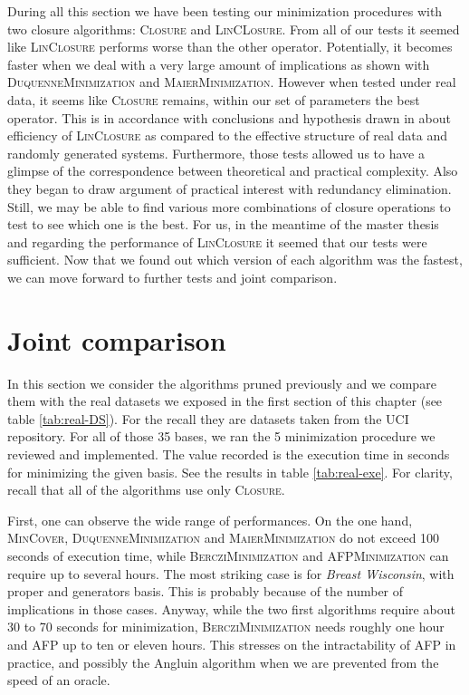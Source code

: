 During all this section we have been testing our minimization procedures with two closure algorithms: \textsc{Closure} and \textsc{LinCLosure}. From all of
our tests it seemed like \textsc{LinClosure} performs worse than the 
other operator. Potentially, it becomes faster when we deal with a very large amount of implications as shown with \textsc{DuquenneMinimization} and \textsc{MaierMinimization}. However when tested under real data, it seems like \textsc{Closure} remains, within our set of parameters the best operator. This is in accordance with conclusions and hypothesis drawn in
\cite{bazhanov_optimizations_2014} about efficiency of \textsc{LinClosure} as compared to the effective structure of real data and randomly generated systems. Furthermore, those tests allowed us to have a glimpse of the correspondence between theoretical and practical complexity. Also they began to draw argument of practical interest with redundancy elimination. Still, we may be able to find various more combinations of closure operations to test to see which one is the best. For us, in the meantime of the master thesis and regarding the performance of \textsc{LinClosure} it seemed that our tests were sufficient. Now that we found out which version of each algorithm was the fastest, we can move forward to further tests and joint comparison.

\begin{figure}[H]
	
\end{figure}


\section{Joint comparison}

In this section we consider the algorithms pruned previously and we compare them
with the real datasets we exposed in the first section of this chapter (see table \ref{tab:real-DS}). For the recall they are datasets taken from the UCI 
repository. For all of those 35 bases, we ran the 5 minimization procedure
we reviewed and implemented. The value recorded is the execution time in seconds
for minimizing the given basis. See the results in table \ref{tab:real-exe}. For clarity, recall that all of the algorithms use only \textsc{Closure}.

\vspace{1.2em}

First, one can observe the wide range of performances. On the one hand,
\textsc{MinCover}, \textsc{DuquenneMinimization}  and \textsc{MaierMinimization} do not exceed 100 seconds of execution time, while \textsc{BercziMinimization} and \textsc{AFPMinimization} can require up to several hours. The most striking case is for \textit{Breast Wisconsin}, with proper and generators basis. This is probably because of the number of implications in those cases. Anyway, while the two first algorithms require about 30 to 70 seconds for minimization, \textsc{BercziMinimization} needs roughly one hour and \textsc{AFP} up to ten or eleven hours. This stresses on the intractability of \textsc{AFP} in practice, and possibly the Angluin algorithm when we are prevented from the speed of an oracle.

